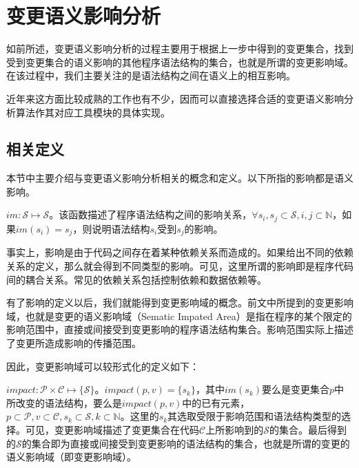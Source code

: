 


\section{变更语义影响分析}
\label {chap_impact}
如前所述，变更语义影响分析的过程主要用于根据上一步中得到的变更集合，找到受到变更集合的语义影响的其他程序语法结构的集合，也就是所谓的变更影响域。在该过程中，我们主要关注的是语法结构之间在语义上的相互影响。

近年来这方面比较成熟的工作也有不少，因而可以直接选择合适的变更语义影响分析算法作其对应工具模块的具体实现。


\subsection{相关定义}

本节中主要介绍与变更语义影响分析相关的概念和定义。以下所指的影响都是语义影响。

\begin{definition}
	$im: \mathcal{S} \mapsto \mathcal{S}$。该函数描述了程序语法结构之间的影响关系，$\forall s_i,s_j \subset \mathcal{S},i,j \subset \mathbb{N}$，如果$im(s_i) = s_j$，则说明语法结构$s_i$受到$s_j$的影响。
\end{definition}

事实上，影响是由于代码之间存在着某种依赖关系而造成的。如果给出不同的依赖关系的定义，那么就会得到不同类型的影响。可见，这里所谓的影响即是程序代码间的耦合关系。常见的依赖关系包括控制依赖和数据依赖等。

有了影响的定义以后，我们就能得到变更影响域的概念。前文中所提到的变更影响域，也就是变更的语义影响域（Sematic Impated Area）是指在程序的某个限定的影响范围中，直接或间接受到变更影响的程序语法结构集合。影响范围实际上描述了变更所造成影响的传播范围。

因此，变更影响域可以较形式化的定义如下：

\begin{definition}
	$impact: \mathcal{P} \times \mathcal{C} \mapsto \{\mathcal{S}\}$。$impact(p,v) = \{s_k\}$，其中$im(s_k)$要么是变更集合$p$中所改变的语法结构，要么是$impact(p,v)$中的已有元素，$p \subset \mathcal{P},v \subset \mathcal{C}, s_k \subset \mathcal{S},k \subset \mathbb{N}$。这里的$s_k$其选取受限于影响范围和语法结构类型的选择。可见，变更影响域描述了变更集合在代码$\mathcal{C}$上所影响到的$\mathcal{S}$的集合。最后得到的$\mathcal{S}$的集合即为直接或间接受到变更影响的语法结构的集合，也就是所谓的变更的语义影响域（即变更影响域）。
\end{definition}

